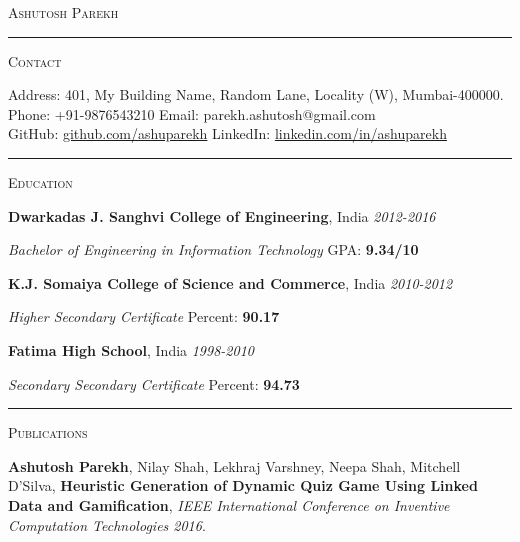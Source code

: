 \documentclass[11pt,a4paper]{article}
\newcommand{\bspace}{\vspace{4.0mm}} %
\newcommand{\ispace}{\vspace{1.8mm}} %
\begin{document}
	
	\begin{center}
		\Huge \scshape Ashutosh Parekh
	\end{center}
	
	\hrule
	\bspace
	
	\begin{minipage}[t]{0.2\textwidth}
		\textsc{Contact} 
	\end{minipage}
	\begin{minipage}[t]{0.8\textwidth}	
		\justify
		Address: 401, My Building Name, Random Lane, Locality (W), Mumbai-400000. \\
		Phone: +91-9876543210 \hfill Email: parekh.ashutosh@gmail.com \\
		GitHub: \href{https://github.com/ashuparekh}{github.com/ashuparekh} \hfill LinkedIn: \href{https://linkedin.com/in/ashuparekh}{linkedin.com/in/ashuparekh}
	\end{minipage}
	
	\bspace
	\hrule
	\bspace
	
	\begin{minipage}[t]{0.2\textwidth}
		\textsc{Education} 
	\end{minipage}
	\begin{minipage}[t]{0.8\textwidth}
		
		\textbf{Dwarkadas J. Sanghvi College of Engineering}, India \hfill \textit{2012-2016}
		
		\textit{Bachelor of Engineering in Information Technology} \hspace{8mm} GPA: \textbf{9.34/10}
		
		\ispace
		
		\textbf{K.J. Somaiya College of Science and Commerce}, India \hfill \textit{2010-2012}
		
		\textit{Higher Secondary Certificate} \hspace{47mm} Percent: \textbf{90.17}
		
		\ispace
		
		\textbf{Fatima High School}, India \hfill \textit{1998-2010}
		
		\textit{Secondary Secondary Certificate} \hspace{41mm} Percent: \textbf{94.73}
	\end{minipage}
	
	\bspace
	\hrule
	\bspace
	
	
	\begin{minipage}[t]{0.2\textwidth}
		\textsc{Publications} 
	\end{minipage}
	\begin{minipage}[t]{0.8\textwidth}
		\justify
		\textbf{Ashutosh Parekh}, Nilay Shah, Lekhraj Varshney, Neepa Shah, Mitchell D'Silva, \textbf{Heuristic Generation of Dynamic Quiz Game Using Linked Data and Gamification}, \textit{IEEE International Conference on Inventive Computation Technologies 2016}.
	\end{minipage}
	
\end{document}
